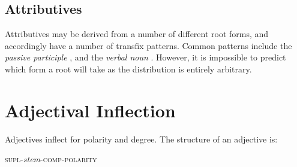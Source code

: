 \documentclass[grammar]{subfiles}
\begin{document}
%

  \subsection{Attributives}
  \label{ssec:am_attributives}

  Attributives may be derived from a number of different root forms, and accordingly have a number of transfix patterns. 
  Common patterns include the \emph{passive participle} , and the \emph{verbal noun} . 
  However, it is impossible to predict which form a root will take as the distribution is entirely arbitrary.

%
%

  \section{Adjectival Inflection}
  \label{sec:am_adjectival_inflection}

  Adjectives inflect for polarity and degree. The structure of an adjective is:

  \begin{exe}
    \ex\label{ex:am_adjective_structure} \textsc{supl-}\textit{stem}\textsc{-comp-polarity}
  \end{exe}	
\end{document}
